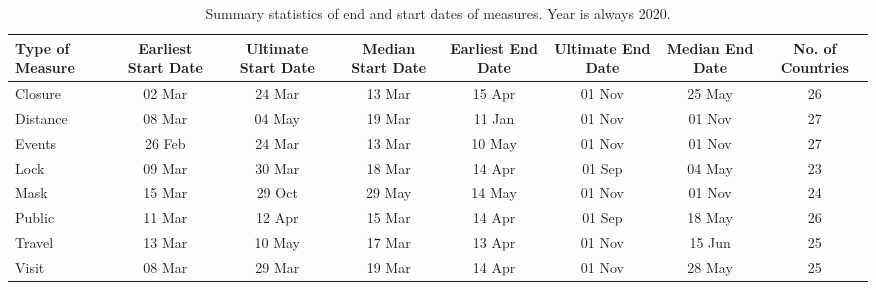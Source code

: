 \begin{table}[ht]
\centering
\begingroup\small
\begin{tabular}{lccccccc}
  \toprule
Type of Measure & Earliest Start Date & Ultimate Start Date & Median Start Date & Earliest End Date & Ultimate End Date & Median End Date & No. of Countries \\ 
  \midrule
Closure & 02 Mar & 24 Mar & 13 Mar & 15 Apr & 01 Nov & 25 May &  26 \\ 
  Distance & 08 Mar & 04 May & 19 Mar & 11 Jan & 01 Nov & 01 Nov &  27 \\ 
  Events & 26 Feb & 24 Mar & 13 Mar & 10 May & 01 Nov & 01 Nov &  27 \\ 
  Lock & 09 Mar & 30 Mar & 18 Mar & 14 Apr & 01 Sep & 04 May &  23 \\ 
  Mask & 15 Mar & 29 Oct & 29 May & 14 May & 01 Nov & 01 Nov &  24 \\ 
  Public & 11 Mar & 12 Apr & 15 Mar & 14 Apr & 01 Sep & 18 May &  26 \\ 
  Travel & 13 Mar & 10 May & 17 Mar & 13 Apr & 01 Nov & 15 Jun &  25 \\ 
  Visit & 08 Mar & 29 Mar & 19 Mar & 14 Apr & 01 Nov & 28 May &  25 \\ 
   \bottomrule
\end{tabular}
\endgroup
\caption{Summary statistics of end and start dates of measures. Year is always 2020.} 
\label{tab:sum_pol}
\end{table}
